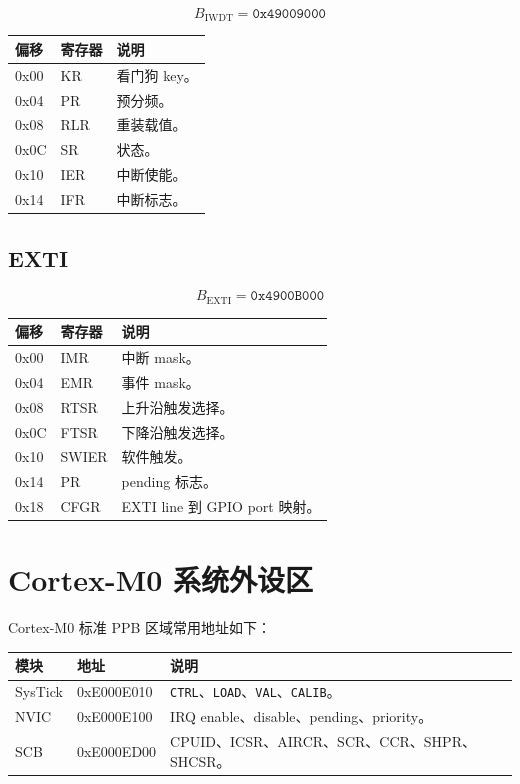 \documentclass[UTF8,a4paper,11pt]{ctexart}
\newcommand{\addr}[1]{\texttt{#1}}
\newcommand{\reg}[1]{\texttt{#1}}
\begin{document}
\[
  B_{\mathrm{IWDT}} = \addr{0x49009000}
\]

\begin{center}
\begin{tabular}{>{\ttfamily}p{2cm}p{3cm}p{8cm}}
\toprule
偏移 & 寄存器 & 说明 \\
\midrule
0x00 & KR & 看门狗 key。\\
0x04 & PR & 预分频。\\
0x08 & RLR & 重装载值。\\
0x0C & SR & 状态。\\
0x10 & IER & 中断使能。\\
0x14 & IFR & 中断标志。\\
\bottomrule
\end{tabular}
\end{center}

\subsection{EXTI}

\[
  B_{\mathrm{EXTI}} = \addr{0x4900B000}
\]

\begin{center}
\begin{tabular}{>{\ttfamily}p{2cm}p{3cm}p{8cm}}
\toprule
偏移 & 寄存器 & 说明 \\
\midrule
0x00 & IMR & 中断 mask。\\
0x04 & EMR & 事件 mask。\\
0x08 & RTSR & 上升沿触发选择。\\
0x0C & FTSR & 下降沿触发选择。\\
0x10 & SWIER & 软件触发。\\
0x14 & PR & pending 标志。\\
0x18 & CFGR & EXTI line 到 GPIO port 映射。\\
\bottomrule
\end{tabular}
\end{center}

\section{Cortex-M0 系统外设区}

Cortex-M0 标准 PPB 区域常用地址如下：

\begin{longtable}{p{3cm}>{\ttfamily}p{3.6cm}p{7cm}}
\toprule
模块 & 地址 & 说明 \\
\midrule
\endhead
SysTick & 0xE000E010 & \reg{CTRL}、\reg{LOAD}、\reg{VAL}、\reg{CALIB}。\\
NVIC & 0xE000E100 & IRQ enable、disable、pending、priority。\\
SCB & 0xE000ED00 & CPUID、ICSR、AIRCR、SCR、CCR、SHPR、SHCSR。\\
\bottomrule
\end{longtable}
\end{document}
